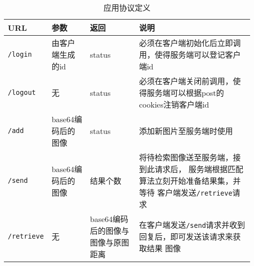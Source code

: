 
\begin{table}[H]
  \centering
    \begin{tabular}{| l | p{2cm} | p{2cm} | p{5cm} |}
    \hline
    URL & 参数 & 返回 & 说明 \\
    \hline
    \texttt{/login}
  & 由客户端生成的id
  & status
  & 必须在客户端初始化后立即调用，使得服务端可以登记客户端id \\
    \hline
    \texttt{/logout}
  & 无
  & status
  & 必须在客户端关闭前调用，使得服务端可以根据post的cookies注销客户端id \\
    \hline
    \texttt{/add}
  & base64编码后的图像
  & status
  & 添加新图片至服务端时使用 \\
    \hline
    \texttt{/send}
  & base64编码后的图像
  & 结果个数
  & 将待检索图像送至服务端，接到此请求后，
    服务端根据匹配算法立刻开始准备结果集，并等待
    客户端发送\texttt{/retrieve}请求 \\
    \hline
    \texttt{/retrieve}
  & 无
  & base64编码后的图像与图像与原图距离
  & 在客户端发送\texttt{/send}请求并收到回复后，即可发送该请求来获取结果
    图像 \\
    \hline
  \end{tabular}
  \caption{应用协议定义}
  \label{tab:app-proto-def}
\end{table}


